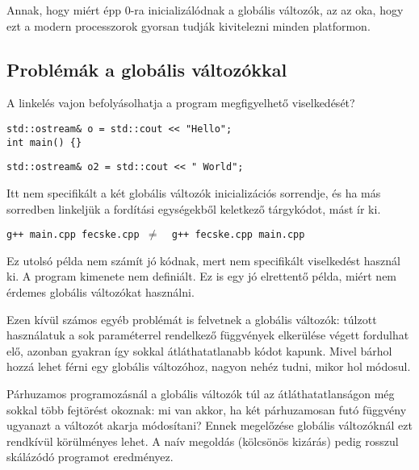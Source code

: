 \documentclass[a4paper,11.5pt,table]{article}
\begin{document}
	Annak, hogy miért épp 0-ra inicializálódnak a globális változók, az az oka, hogy ezt a modern processzorok gyorsan tudják kivitelezni minden platformon. 
	\subsection{Problémák a globális változókkal}
	
	A linkelés vajon befolyásolhatja a program megfigyelhető viselkedését?
	\bigskip
	
	\begin{lstlisting}
std::ostream& o = std::cout << "Hello";
int main() {}
	\end{lstlisting}
	\bigskip
	
	\begin{lstlisting}
std::ostream& o2 = std::cout << " World";
	\end{lstlisting}
	Itt nem specifikált a két globális változók inicializációs sorrendje, és ha más sorredben linkeljük a fordítási egységekből keletkező tárgykódot, mást ír ki.
	
	{\centering \texttt{g++ main.cpp fecske.cpp \quad $\not=$\quad\, g++ fecske.cpp main.cpp} \par}
	
	\begin{note}
		Ez utolsó példa nem számít jó kódnak, mert nem specifikált viselkedést használ ki. A program kimenete nem definiált. Ez is egy jó elrettentő példa, miért nem érdemes globális változókat használni.
	\end{note}
	
	Ezen kívül számos egyéb problémát is felvetnek a globális változók: túlzott használatuk a sok paraméterrel rendelkező függvények elkerülése végett fordulhat elő, azonban gyakran így sokkal átláthatatlanabb kódot kapunk. Mivel bárhol hozzá lehet férni egy globális változóhoz, nagyon nehéz tudni, mikor hol módosul.
	\begin{note}
    Párhuzamos programozásnál a globális változók túl az átláthatatlanságon még sokkal több fejtörést okoznak: mi van akkor, ha két párhuzamosan futó függvény ugyanazt a változót akarja módosítani? Ennek megelőzése globális változóknál ezt rendkívül körülményes lehet. A naív megoldás (kölcsönös kizárás) pedig rosszul skálázódó programot eredményez.
	\end{note}
\end{document}
